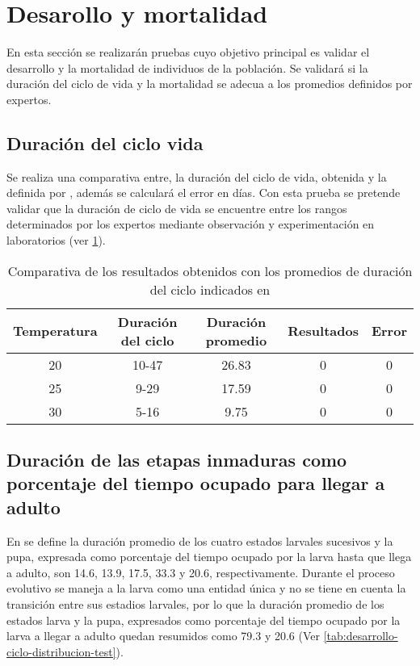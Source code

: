 \section{Desarollo y mortalidad}
En esta sección se realizarán pruebas cuyo objetivo principal es validar el desarrollo y la mortalidad de
individuos de la población. Se validará si la duración del ciclo de vida y la mortalidad se adecua a los
promedios definidos por expertos.

\subsection{Duración del ciclo vida}
Se realiza una comparativa entre, la duración del ciclo de vida, obtenida y la definida por
\cite{dengueUruguayCap2}, además se calculará el error en días. Con esta prueba se pretende
validar que la duración de ciclo de vida se encuentre entre los rangos determinados por los 
expertos mediante observación y experimentación en laboratorios (ver \ref{tab:desarrollo-ciclo-test}).

\begin{table}
\begin{tabular}{c c c c c }
Temperatura & Duración del ciclo& Duración promedio & Resultados & Error\\
\hline
20  & 10-47  & 26.83 & 0 & 0   \\
25  & 9-29  & 17.59 & 0 & 0   \\
30  & 5-16  & 9.75 & 0 & 0   \\
\end{tabular}
\caption{ \label{tab:desarrollo-ciclo-test} Comparativa de los resultados obtenidos con los 
promedios de duración del ciclo indicados en \cite{dengueUruguayCap2}}
\end{table}

\subsection{Duración de las etapas inmaduras como porcentaje del tiempo ocupado para llegar a adulto}
En \cite{dengueUruguayCap2} se define la duración promedio de los cuatro estados larvales sucesivos y la
pupa, expresada como porcentaje del tiempo ocupado por la larva hasta que llega a adulto, son 14.6, 13.9,
17.5, 33.3 y 20.6, respectivamente. Durante el proceso evolutivo se maneja a la larva como una entidad
única y no se tiene en cuenta la transición entre sus estadios larvales, por lo que la duración promedio
de los estados larva y la pupa, expresados como porcentaje del tiempo ocupado por la larva a llegar a
adulto quedan resumidos como 79.3 y 20.6 (Ver \ref{tab:desarrollo-ciclo-distribucion-test}).

